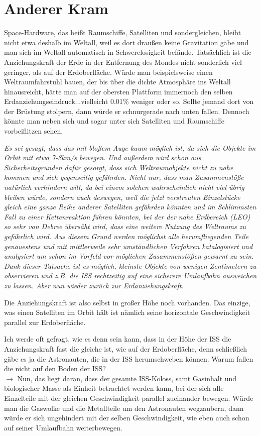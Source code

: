 \documentclass[12pt,paper=A4,numbers=noenddot,bibliography=totoc,listof=totoc,DIV=11,BCOR=1mm]{scrreprt}
\newcommand{\gq}[1]{\glqq #1\grqq} %
\begin{document}
\section{Anderer Kram}
Space-Hardware, das heißt Raumschiffe, Satelliten und sondergleichen, bleibt nicht etwa deshalb im Weltall, weil es dort draußen keine Gravitation gäbe und man sich im Weltall automatisch in Schwerelosigkeit befände.
Tatsächlich ist die Anziehungskraft der Erde in der Entfernung des Mondes nicht sonderlich viel geringer, als auf der Erdoberfläche.
Würde man beispielsweise einen Weltraumfahrstuhl bauen, der bis über die dichte Atmosphäre ins \gq{Weltall} hinausreicht, hätte man auf der obersten Plattform immernoch den selben Erdanziehungseindruck...vielleicht 0.01\% weniger oder so.
Sollte jemand dort von der Brüstung stolpern, dann würde er schnurgerade nach unten fallen.
Dennoch könnte man neben sich und sogar unter sich Satelliten und Raumschiffe vorbeiflitzen sehen.

\emph{Es sei gesagt, dass das mit bloßem Auge kaum möglich ist, da sich die Objekte im Orbit mit etwa 7-8km/s bewegen. Und außerdem wird schon aus Sicherheitsgründen dafür gesorgt, dass sich Weltraumobjekte nicht zu nahe kommen und sich gegenseitig gefährden. Nicht nur, dass man Zusammenstöße natürlich verhindern will, da bei einem solchen wahrscheinlich nicht viel übrig bleiben würde, sondern auch deswegen, weil die jetzt verstreuten Einzelstücke gleich eine ganze Reihe anderer Satelliten gefährden könnten und im Schlimmsten Fall zu einer Kettenreaktion führen könnten, bei der der nahe Erdbereich (LEO) so sehr von Debree übersäht wird, dass eine weitere Nutzung des Weltraums zu gefährlich wird. Aus diesem Grund werden möglichst alle herumfliegenden Teile genauestens und mit mittlerweile sehr umständlichen Verfahren katalogisiert und analysiert um schon im Vorfeld vor möglichen Zusammenstößen gewarnt zu sein. Dank dieser Tatsache ist es möglich, kleinste Objekte von wenigen Zentimetern zu observieren und z.B. die ISS rechtzeitig auf eine sicherere Umlaufbahn ausweichen zu lassen.
Aber nun wieder zurück zur Erdanziehungskraft.}

Die Anziehungskraft ist also selbst in großer Höhe noch vorhanden. Das einzige, was einen Satelliten im Orbit hält ist nämlich seine horizontale Geschwindigkeit parallel zur Erdoberfläche.

Ich werde oft gefragt, wie es denn sein kann, dass in der Höhe der ISS die Anziehungskraft fast die gleiche ist, wie auf der Erdoberfläche, denn schließlich gäbe es ja die Astronauten, die in der ISS herumschweben können. Warum fallen die nicht auf den Boden der ISS?\\
$\rightarrow$ Nun, das liegt daran, dass der gesamte ISS-Koloss, samt Gasinhalt und biologischer Masse als Einheit betrachtet werden kann, bei der sich alle Einzelteile mit der gleichen Geschwindigkeit parallel zueinander bewegen. Würde man die Gaswolke und die Metallteile um den Astronauten wegzaubern, dann würde er sich ungehindert mit der selben Geschwindigkeit, wie eben auch schon auf seiner Umlaufbahn weiterbewegen.
\end{document}
